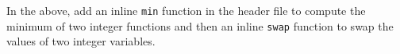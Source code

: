 In the above, add an inline \texttt{min} function in the header file to compute the minimum of two integer functions and then an inline \texttt{swap} function to swap the values of two integer variables.

